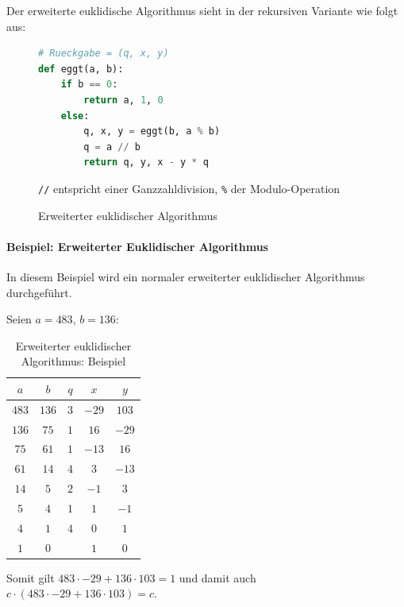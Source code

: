 \documentclass[a4paper, 11pt, accentcolor = tud3b]{tudreport}
\begin{document}
	            Der erweiterte euklidische Algorithmus sieht in der rekursiven Variante wie folgt aus:
	            \begin{figure}[H]
	            	\centering
	            	\begin{lstlisting}[language = Python]
# Rueckgabe = (q, x, y)
def eggt(a, b):
	if b == 0:
		return a, 1, 0
	else:
		q, x, y = eggt(b, a % b)
		q = a // b
		return q, y, x - y * q
\end{lstlisting}
					\texttt{//} entspricht einer Ganzzahldivision, \texttt{\%} der Modulo-Operation
	            	\caption{Erweiterter euklidischer Algorithmus}
	            \end{figure}
            
	            \paragraph{Beispiel: Erweiterter Euklidischer Algorithmus}
		            In diesem Beispiel wird ein normaler erweiterter euklidischer Algorithmus durchgeführt.
		            
		            Seien \( a = 483 \), \( b = 136 \):
		            \begin{table}[H]
		            	\centering
		            	\begin{tabular}{|c|c|c|c|c|}
		            		\hline
		            		      \(a\)       &  \(b\)  & \(q\) &        \(x\)        &        \(y\)        \\ \hline
		            		     \(483\)      & \(136\) & \(3\) & \underline{\(-29\)} & \underline{\(103\)} \\ \hline
		            		     \(136\)      & \(75\)  & \(1\) &       \(16\)        &       \(-29\)       \\ \hline
		            		     \(75\)       & \(61\)  & \(1\) &       \(-13\)       &       \(16\)        \\ \hline
		            		     \(61\)       & \(14\)  & \(4\) &        \(3\)        &       \(-13\)       \\ \hline
		            		     \(14\)       &  \(5\)  & \(2\) &       \(-1\)        &        \(3\)        \\ \hline
		            		      \(5\)       &  \(4\)  & \(1\) &        \(1\)        &       \(-1\)        \\ \hline
		            		      \(4\)       &  \(1\)  & \(4\) &        \(0\)        &        \(1\)        \\ \hline
		            		\underline{\(1\)} &  \(0\)  & \(\)  &        \(1\)        &        \(0\)        \\ \hline
		            	\end{tabular}
		            	\caption{Erweiterter euklidischer Algorithmus: Beispiel}
		            \end{table}
		            Somit gilt \( 483 \cdot -29 + 136 \cdot 103 = 1 \) und damit auch \( c \cdot (483 \cdot -29 + 136 \cdot 103) = c \).
	            
\end{document}
